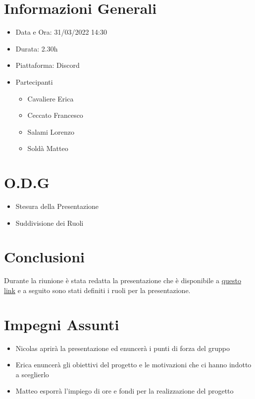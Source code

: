 \documentclass[a4paper, 12pt]{article}
\begin{document}
\makefrontpage

\section*{Informazioni Generali}
\begin{itemize}
    \item Data e Ora: 31/03/2022 14:30
    \item Durata: 2.30h
    \item Piattaforma: Discord
    \item Partecipanti
    \begin{itemize}
        \item Cavaliere Erica
        \item Ceccato Francesco
        \item Salami Lorenzo
        \item Soldà Matteo
    \end{itemize}
\end{itemize}

\section*{O.D.G}
\begin{itemize}
    \item Stesura della Presentazione
    \item Suddivisione dei Ruoli
\end{itemize}
\section*{Conclusioni}
Durante la riunione è stata redatta la presentazione che è disponibile a \href{https://docs.google.com/presentation/d/1q5C9cintD9a9LuzmrnLJhhMuKx2U1wPsjbUwr0Ixa3M/edit?usp=sharing}{questo link} e a seguito sono stati definiti i ruoli per la presentazione.
\section*{Impegni Assunti}
\begin{itemize}
    \item Nicolas aprirà la presentazione ed enuncerà i punti di forza del gruppo
    \item Erica enuncerà gli obiettivi del progetto e le motivazioni che ci hanno indotto a sceglierlo
    \item Matteo esporrà l'impiego di ore e fondi per la realizzazione del progetto
\end{itemize}
\end{document}
